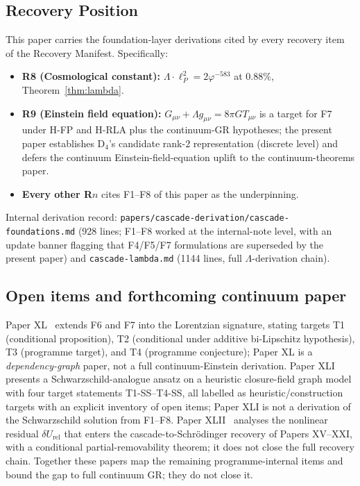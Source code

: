 \documentclass[12pt]{article}
\theoremstyle{definition}
\theoremstyle{remark}
\begin{document}
\subsection{Recovery Position}

This paper carries the foundation-layer derivations cited by every recovery item of the Recovery Manifest. Specifically:
\begin{itemize}
\item \textbf{R8 (Cosmological constant):} $\Lambda \cdot \ell_P^2 = 2\varphi^{-583}$ at $0.88\%$, Theorem~\ref{thm:lambda}.
\item \textbf{R9 (Einstein field equation):} $G_{\mu\nu} + \Lambda g_{\mu\nu} = 8\pi G T_{\mu\nu}$ is a target for F7 under H-FP and H-RLA plus the continuum-GR hypotheses; the present paper establishes D$_4$'s candidate rank-$2$ representation (discrete level) and defers the continuum Einstein-field-equation uplift to the continuum-theorems paper.
\item \textbf{Every other R$n$} cites F1--F8 of this paper as the underpinning.
\end{itemize}

Internal derivation record: \texttt{papers/cascade-derivation/cascade-foundations.md} (928 lines; F1--F8 worked at the internal-note level, with an update banner flagging that F4/F5/F7 formulations are superseded by the present paper) and \texttt{cascade-lambda.md} (1144 lines, full $\Lambda$-derivation chain).

\subsection{Open items and forthcoming continuum paper}

Paper XL~\citep{SmartXL} extends F6 and F7 into the Lorentzian signature, stating targets T1 (conditional proposition), T2 (conditional under additive bi-Lipschitz hypothesis), T3 (programme target), and T4 (programme conjecture); Paper XL is a \emph{dependency-graph} paper, not a full continuum-Einstein derivation. Paper XLI~\citep{SmartXLI} presents a Schwarzschild-analogue ansatz on a heuristic closure-field graph model with four target statements T1-SS--T4-SS, all labelled as heuristic/construction targets with an explicit inventory of open items; Paper XLI is not a derivation of the Schwarzschild solution from F1--F8. Paper XLII~\citep{SmartXLII} analyses the nonlinear residual $\delta U_{\mathrm{rel}}$ that enters the cascade-to-Schr\"odinger recovery of Papers XV--XXI, with a conditional partial-removability theorem; it does not close the full recovery chain. Together these papers map the remaining programme-internal items and bound the gap to full continuum GR; they do not close it.
\end{document}
